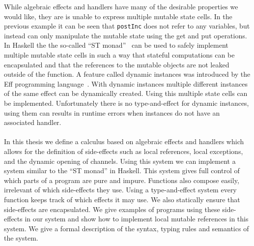 While algebraic effects and handlers have many of the desirable properties we would like, they are is unable to express multiple mutable state cells.
In the previous example it can be seen that \texttt{postInc} does not refer to any variables, but instead can only manipulate the mutable state using the get and put operations.
In Haskell the the so-called ``ST monad''~\cite{runst} can be used to safely implement multiple mutable state cells in such a way that stateful computations can be encapsulated and that the references to the mutable objects are not leaked outside of the function. 
A feature called dynamic instances was introduced by the Eff programming language~\cite{eff1}.
With dynamic instances multiple different instances of the same effect can be dynamically created.
Using this multiple state cells can be implemented.
Unfortunately there is no type-and-effect for dynamic instances, using them can results in runtime errors when instances do not have an associated handler.
\\\\
In this thesis we define a calculus based on algebraic effects and handlers which allows for the definition of side-effects such as local references, local exceptions, and the dynamic opening of channels.
Using this system we can implement a system similar to the ``ST monad'' in Haskell.
This system gives full control of which parts of a program are pure and impure.
Functions also compose easily, irrelevant of which side-effects they use.
Using a type-and-effect system every function keeps track of which effects it may use.
We also statically ensure that side-effects are encapsulated.
We give examples of programs using these side-effects in our system and show how to implement local mutable references in this system.
We give a formal description of the syntax, typing rules and semantics of the system.

